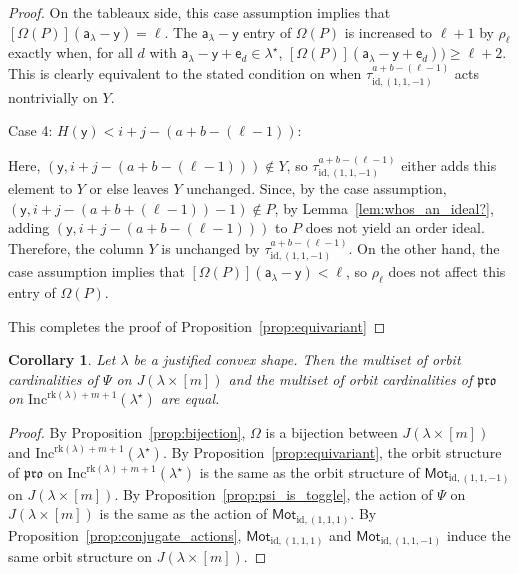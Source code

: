 \documentclass[12pt]{amsart}
\newcommand{\y}{\ensuremath{\mathsf{y}}}
\newcommand{\e}{\ensuremath{\mathsf{e}}}
\newcommand{\aaa}{\ensuremath{\mathsf{a}}}
\newtheorem{corollary}[theorem]{Corollary}
\theoremstyle{definition}
\theoremstyle{remark}
\numberwithin{equation}{section}
\newcommand{\inc}{\ensuremath{\mathrm{Inc}}}
\newcommand{\pro}{\mathfrak{pro}}
\newcommand{\rank}{\ensuremath{\mathrm{rk}}}
\newcommand{\mot}{\ensuremath{\mathsf{Mot}}}
\begin{document}
\begin{proof}
On the tableaux side, this case assumption implies that $[\Omega(P)](\aaa_\lambda - \y) = \ell$. The $\aaa_\lambda - \y$ entry of $\Omega(P)$ is increased to $\ell+1$ by $\rho_\ell$ exactly when, for all $d$ with $\aaa_\lambda - \y +\e_d \in \lambda^\star$, $[\Omega(P)](\aaa_\lambda - \y + \e_d)) \geq \ell+2$. This is clearly equivalent to the stated condition on when $\tau^{a+b-(\ell-1)}_{\text{id},(1,1,-1)}$ acts nontrivially on $Y$.

\medskip
\noindent
{\sf Case 4: $H(\y) < i+j-(a+b-(\ell-1))$:} 

Here, $(\y,i+j-(a+b-(\ell-1))) \notin Y$, so $\tau^{a+b-(\ell-1)}_{\text{id},(1,1,-1)}$ either adds this element to $Y$ or else leaves $Y$ unchanged. Since, by the case assumption, $(\y,i+j-(a+b+(\ell-1))-1) \notin P$, by Lemma~\ref{lem:whos_an_ideal?}, adding $(\y,i+j-(a+b-(\ell-1)))$ to $P$ does not yield an order ideal. Therefore, the column $Y$ is unchanged by $\tau^{a+b-(\ell-1)}_{\text{id},(1,1,-1)}$. On the other hand, the case assumption implies that $[\Omega(P)](\aaa_\lambda - \y) < \ell$, so $\rho_\ell$ does not affect this entry of $\Omega(P)$. 

\medskip
This completes the proof of Proposition~\ref{prop:equivariant}
\end{proof}

\begin{corollary}
Let $\lambda$ be a justified convex shape.
Then the multiset of orbit cardinalities of $\Psi$ on $J(\lambda \times [m])$ and the multiset of orbit cardinalities of $\pro$ on $\inc^{\rank(\lambda)+ m+1}(\lambda^\star)$ are equal.
\end{corollary}
\begin{proof}
By Proposition~\ref{prop:bijection}, $\Omega$ is a bijection between $J(\lambda \times [m])$ and $\inc^{\rank(\lambda)+ m+1}(\lambda^\star)$. By Proposition~\ref{prop:equivariant}, the orbit structure of $\pro$ on $\inc^{\rank(\lambda)+ m+1}(\lambda^\star)$ is the same as the orbit structure of $\mot_{\text{id},(1,1,-1)}$ on $J(\lambda \times [m])$. By Proposition~\ref{prop:psi_is_toggle}, the action of $\Psi$ on $J(\lambda \times [m])$ is the same as the action of $\mot_{\text{id},(1,1,1)}$. By Proposition~\ref{prop:conjugate_actions}, $\mot_{\text{id},(1,1,1)}$ and $\mot_{\text{id},(1,1,-1)}$ induce the same orbit structure on $J(\lambda \times [m])$.
\end{proof}
\end{document}
